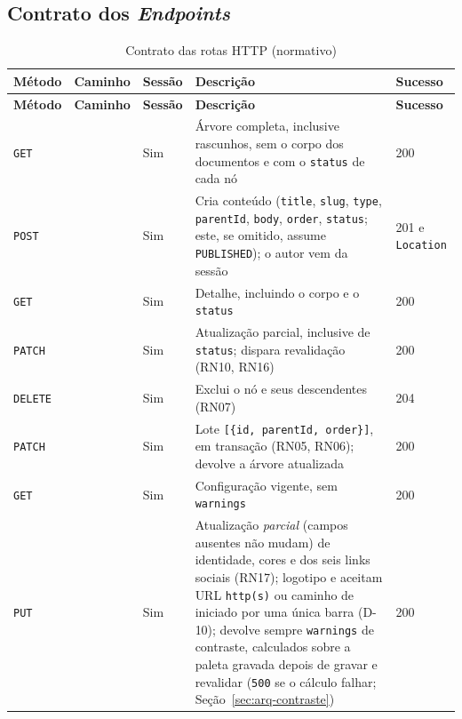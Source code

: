 \subsection{Contrato dos \emph{Endpoints}}

\begin{longtable}{@{}L{1.5cm}L{3.9cm}L{1.6cm}L{4.4cm}L{2.4cm}@{}}
\caption{Contrato das rotas HTTP (normativo)}\label{tab:api}\\
\toprule
\textbf{Método} & \textbf{Caminho} & \textbf{Sessão} & \textbf{Descrição} & \textbf{Sucesso}\\
\midrule
\endfirsthead
\toprule
\textbf{Método} & \textbf{Caminho} & \textbf{Sessão} & \textbf{Descrição} & \textbf{Sucesso}\\
\midrule
\endhead
\bottomrule
\endfoot
\texttt{GET} &  & Sim & Árvore completa, inclusive rascunhos, sem o corpo dos documentos e com o \texttt{status} de cada nó & 200\\[1pt]
\texttt{POST} &  & Sim & Cria conteúdo (\texttt{title}, \texttt{slug}, \texttt{type}, \texttt{parentId}, \texttt{body}, \texttt{order}, \texttt{status}; este, se omitido, assume \texttt{PUBLISHED}); o autor vem da sessão & 201 e \texttt{Location}\\[1pt]
\texttt{GET} &  & Sim & Detalhe, incluindo o corpo e o \texttt{status} & 200\\[1pt]
\texttt{PATCH} &  & Sim & Atualização parcial, inclusive de \texttt{status}; dispara revalidação (RN10, RN16) & 200\\[1pt]
\texttt{DELETE} &  & Sim & Exclui o nó e seus descendentes (RN07) & 204\\[1pt]
\texttt{PATCH} &  & Sim & Lote \texttt{[\{id, parentId, order\}]}, em transação (RN05, RN06); devolve a árvore atualizada & 200\\[1pt]
\texttt{GET} &  & Sim & Configuração vigente, sem \texttt{warnings} & 200\\[1pt]
\texttt{PUT} &  & Sim & Atualização \emph{parcial} (campos ausentes não mudam) de identidade, cores e dos seis links sociais (RN17); logotipo e  aceitam URL \texttt{http(s)} ou caminho de  iniciado por uma única barra (D-10); devolve sempre \texttt{warnings} de contraste, calculados sobre a paleta gravada depois de gravar e revalidar (\texttt{500} se o cálculo falhar; Seção~\ref{sec:arq-contraste}) & 200\\[1pt]

\end{longtable}

